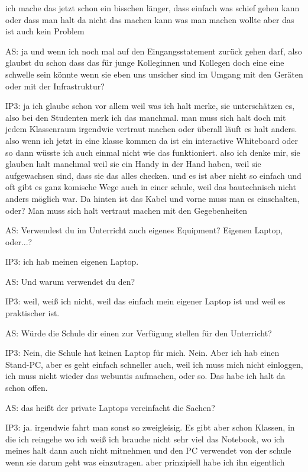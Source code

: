 \documentclass[fontsize=11pt,paper=a4]{scrbook}
\begin{document}
{\begin{itemize*}
ich mache das jetzt schon ein bisschen
länger, dass einfach was schief gehen kann
oder dass  man halt da nicht das
machen kann was man machen wollte aber
das ist auch kein Problem
\item[AS:] ja und wenn
ich noch mal auf den Eingangsstatement
zurück gehen darf, also glaubst du schon
dass das für junge Kolleginnen und
Kollegen
doch eine eine schwelle sein könnte wenn
sie eben uns unsicher sind im Umgang mit
den Geräten oder mit der Infrastruktur?
\item[IP3:]ja ich glaube schon vor allem weil was ich
halt merke, sie unterschätzen es, also bei
den Studenten merk ich das manchmal. man
muss sich halt doch mit jedem
Klassenraum irgendwie vertraut machen
oder überall läuft es halt anders. also wenn ich jetzt in eine
klasse kommen da ist ein interactive
Whiteboard oder so dann wüsste ich auch
einmal nicht wie das funktioniert. also
ich denke mir, sie glauben halt manchmal weil sie ein Handy in der Hand haben, weil sie aufgewachsen sind, dass sie das alles checken. und es
ist aber nicht so einfach und oft gibt
es ganz komische Wege auch in einer
schule, weil das bautechnisch nicht anders möglich war. Da hinten
ist das Kabel und vorne muss man es einschalten, oder? Man muss sich halt
vertraut machen mit den Gegebenheiten
\item[AS:] Verwendest du im Unterricht auch eigenes Equipment?  Eigenen Laptop, oder...?
\item[IP3:]ich hab meinen eigenen Laptop.
\item[AS:] Und warum verwendet du den?
\item[IP3:] weil, weiß ich nicht, weil das einfach mein eigener
Laptop ist und weil es praktischer ist.
\item[AS:] Würde die Schule dir einen zur Verfügung stellen für den Unterricht?
\item[IP3:] Nein, die Schule hat keinen Laptop für mich. Nein. Aber ich hab einen Stand-PC, aber es geht einfach
schneller auch, weil ich muss mich nicht einloggen, 
ich muss nicht wieder das webuntis aufmachen, oder so. Das habe ich halt da schon
offen.
\item[AS:] das heißt der private Laptops vereinfacht
die Sachen?
\item[IP3:] ja. irgendwie fahrt man sonst so zweigleisig. Es gibt aber schon Klassen, in die ich reingehe wo ich weiß ich brauche nicht
sehr viel das Notebook, wo ich meines halt dann auch nicht mitnehmen und den PC
verwendet von der schule wenn sie darum
geht was einzutragen.
aber prinzipiell habe ich ihn eigentlich

\end{itemize*}}
\end{document}
